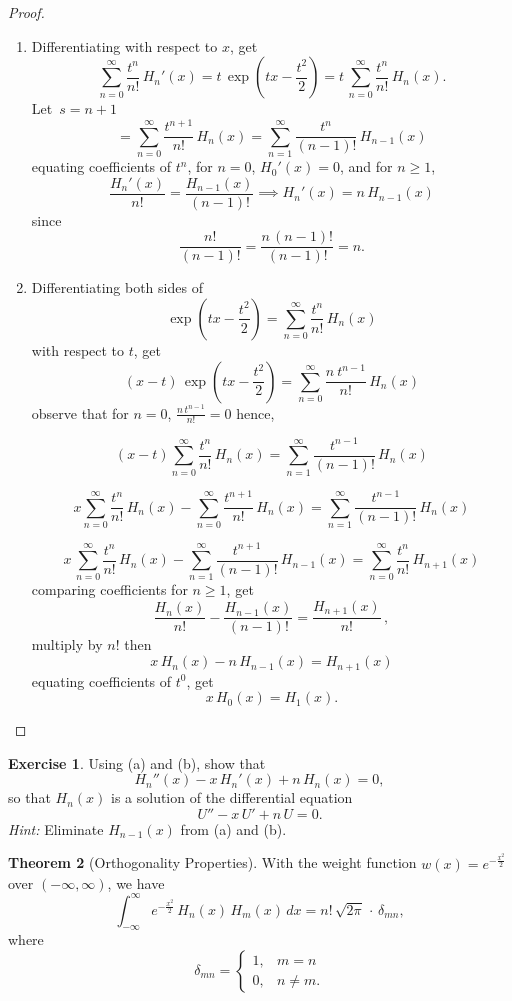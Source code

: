 \documentclass[12pt,a4paper]{report}
\theoremstyle{definition}
\newtheorem{thm}{Theorem}[section]
\newtheorem{exe}[thm]{Exercise}
\theoremstyle{plain}
\begin{document}
\begin{proof}
\begin{enumerate}
\item[(a).] Differentiating with respect to $x$, get 
$$\sum_{n = 0}^{\infty} \frac{t^n}{n!}\, H_n'(x) = t\, \exp\left(tx - \frac{t^2}{2}\right) = t \,\sum_{n = 0}^{\infty} \frac{t^n}{n!}\, H_n(x).$$
Let $\,  s  = n + 1$ 
$$ = \sum_{n = 0}^{\infty}\frac{t^{n + 1}}{n!}\, H_n(x) = \sum_{n = 1}^{\infty} \frac{t^n}{(n - 1)!}\, H_{n-1}(x)$$
equating coefficients of $t^n$, for $n = 0$, $H_0'(x) = 0$, and for $n\geq 1$, 
$$\frac{H_n'(x)}{n!} = \frac{H_{n-1}(x)}{(n-1)!}\implies  H_n'(x) = n\, H_{n-1}(x)$$ since $$\frac{n!}{(n-1)!} = \frac{n\, (n-1)!}{(n-1)!}  = n.$$


\item[(b).] Differentiating both sides of $$\exp\left(tx - \frac{t^2}{2}\right) = \sum_{n=0}^{\infty} \frac{t^n}{n!}\, H_n(x)$$ with respect to  $t$, get
$$(x -t)\, \exp\left(tx - \frac{t^2}{2}\right) = \sum_{n=0}^{\infty} \frac{n\ t^{n-1}}{n!}\, H_n(x)$$
observe that for $n =0$, $\frac{n\, t^{n-1}}{n!} = 0$ hence,

$$(x - t) \sum_{n = 0}^{\infty} \frac{t^n}{n!}\, H_n(x) = \sum_{n=1}^{\infty} \frac{t^{n-1}}{(n-1)!}\, H_n(x)$$

$$x\sum_{n=0}^{\infty} \frac{t^n}{n!}\, H_n(x) - \sum_{n=0}^{\infty} \frac{t^{n + 1}}{n!}\, H_n(x) = \sum_{n = 1}^{\infty}\frac{t^{n-1}}{(n-1)!}\, H_n(x)$$

$$x\, \sum_{n=0}^{\infty}\frac{t^n}{n!}\, H_n(x) - \sum_{n=1}^{\infty}\frac{t^{n + 1}}{(n-1)!}\, H_{n-1}(x) = \sum_{n=0}^{\infty} \frac{t^n}{n!}\, H_{n+1}(x)$$
comparing coefficients for $n\geq 1$, get
$$\frac{H_n(x)}{n!} - \frac{H_{n-1}(x)}{(n-1)!} = \frac{H_{n+1}(x)}{n!}\, , $$
multiply by $n!$ then
$$x\, H_n(x) - n\, H_{n-1}(x) = H_{n+1}(x)$$
equating coefficients of $t^0$, get
$$x\, H_0(x) = H_1(x).$$
\end{enumerate}
\end{proof}



\begin{exe}
Using (a) and (b), show that $$H_n''(x) - x\, H_n'(x) + n\, H_n(x)  = 0,$$ so that $H_n(x)$ is a solution of the differential equation $$U'' - x\, U' + n\, U = 0.$$ \textit{Hint:} Eliminate $H_{n-1}(x)$ from (a) and (b).
\end{exe}




\begin{thm}[Orthogonality Properties]
With the weight function $w(x) = e^{-\frac{x^2}{2}}$ over $(-\infty,\infty)$, we have 
$$\int_{-\infty}^{\infty} e^{-\frac{x^2}{2}}\, H_n(x)\, H_m(x)\, dx = n!\, \sqrt{2\pi}\, \cdot\, \delta_{mn},$$ 
where
$$\delta_{mn} = \begin{cases}
                 1, & m = n\\
                 0, & n\neq m.
               \end{cases}$$
\end{thm}
\end{document}
